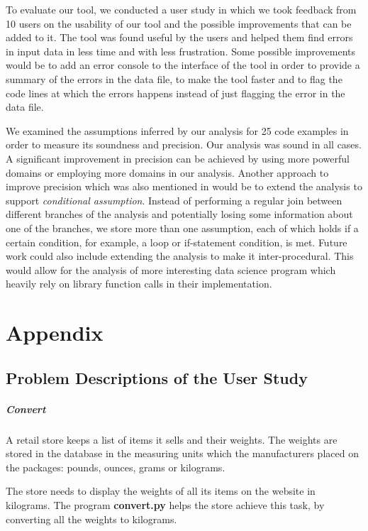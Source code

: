 \documentclass[10pt]{report}
\begin{document}
To evaluate our tool, we conducted a user study in which we took feedback from 10 users on the usability of our tool and the possible improvements that can be added to it. The tool was found useful by the users and helped them find errors in input data in less time and with less frustration. Some possible improvements would be to add an error console to the interface of the tool in order to provide a summary of the errors in the data file, to make the tool faster and to flag the code lines at which the errors happens instead of just flagging the error in the data file. 

We examined the assumptions inferred by our analysis for 25 code examples in order to measure its soundness and precision. Our analysis was sound in all cases. A significant improvement in precision can be achieved by using more powerful domains or employing more domains in our analysis. Another approach to improve precision which was also mentioned in \cite{madelin} would be to extend the analysis to support \textit{conditional assumption}. Instead of performing a regular join between different branches of the analysis and potentially losing some information about one of the branches, we store more than one assumption, each of which holds if a certain condition, for example, a loop or if-statement condition, is met. 
Future work could also include extending the analysis to make it inter-procedural. This would allow for the analysis of more interesting data science program which heavily rely on library function calls in their implementation.  

\appendix
\chapter{Appendix} 

\section{Problem Descriptions of the User Study}

\paragraph{Convert}
A retail store keeps a list of items it sells and their weights. The weights are stored in  the database in the measuring units which the manufacturers placed on the packages: pounds, ounces, grams or kilograms.

The store needs to display the weights of all its items on the website in kilograms. The 
program \textbf{convert.py} helps the store achieve this task, by converting all the weights to kilograms.
\end{document}
